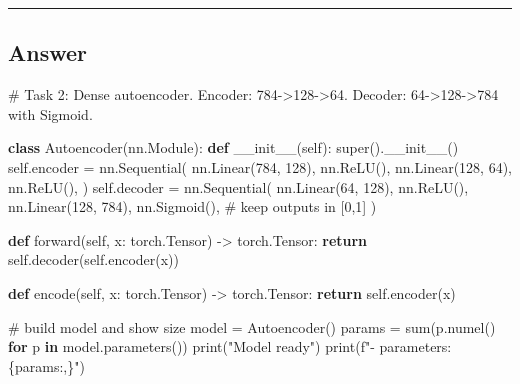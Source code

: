 \documentclass[
  letterpaper,
  DIV=11,
  numbers=noendperiod]{scrartcl}
\newenvironment{Shaded}{\begin{snugshade}}{\end{snugshade}}
\newcommand{\BuiltInTok}[1]{\textcolor[rgb]{0.00,0.23,0.31}{#1}}
\newcommand{\CommentTok}[1]{\textcolor[rgb]{0.37,0.37,0.37}{#1}}
\newcommand{\ControlFlowTok}[1]{\textcolor[rgb]{0.00,0.23,0.31}{\textbf{#1}}}
\newcommand{\DecValTok}[1]{\textcolor[rgb]{0.68,0.00,0.00}{#1}}
\newcommand{\FunctionTok}[1]{\textcolor[rgb]{0.28,0.35,0.67}{#1}}
\newcommand{\KeywordTok}[1]{\textcolor[rgb]{0.00,0.23,0.31}{\textbf{#1}}}
\newcommand{\NormalTok}[1]{\textcolor[rgb]{0.00,0.23,0.31}{#1}}
\newcommand{\OperatorTok}[1]{\textcolor[rgb]{0.37,0.37,0.37}{#1}}
\newcommand{\SpecialCharTok}[1]{\textcolor[rgb]{0.37,0.37,0.37}{#1}}
\newcommand{\SpecialStringTok}[1]{\textcolor[rgb]{0.13,0.47,0.30}{#1}}
\newcommand{\StringTok}[1]{\textcolor[rgb]{0.13,0.47,0.30}{#1}}
\newcommand{\VariableTok}[1]{\textcolor[rgb]{0.07,0.07,0.07}{#1}}
\begin{document}
\begin{center}\rule{0.5\linewidth}{0.5pt}\end{center}

\subsection{Answer}\label{answer-4}

\begin{Shaded}
\begin{Highlighting}[]
\CommentTok{\# Task 2: Dense autoencoder. Encoder: 784{-}\textgreater{}128{-}\textgreater{}64. Decoder: 64{-}\textgreater{}128{-}\textgreater{}784 with Sigmoid.}

\KeywordTok{class}\NormalTok{ Autoencoder(nn.Module):}
    \KeywordTok{def} \FunctionTok{\_\_init\_\_}\NormalTok{(}\VariableTok{self}\NormalTok{):}
        \BuiltInTok{super}\NormalTok{().}\FunctionTok{\_\_init\_\_}\NormalTok{()}
        \VariableTok{self}\NormalTok{.encoder }\OperatorTok{=}\NormalTok{ nn.Sequential(}
\NormalTok{            nn.Linear(}\DecValTok{784}\NormalTok{, }\DecValTok{128}\NormalTok{), nn.ReLU(),}
\NormalTok{            nn.Linear(}\DecValTok{128}\NormalTok{, }\DecValTok{64}\NormalTok{),  nn.ReLU(),}
\NormalTok{        )}
        \VariableTok{self}\NormalTok{.decoder }\OperatorTok{=}\NormalTok{ nn.Sequential(}
\NormalTok{            nn.Linear(}\DecValTok{64}\NormalTok{, }\DecValTok{128}\NormalTok{),  nn.ReLU(),}
\NormalTok{            nn.Linear(}\DecValTok{128}\NormalTok{, }\DecValTok{784}\NormalTok{), nn.Sigmoid(),  }\CommentTok{\# keep outputs in [0,1]}
\NormalTok{        )}

    \KeywordTok{def}\NormalTok{ forward(}\VariableTok{self}\NormalTok{, x: torch.Tensor) }\OperatorTok{{-}\textgreater{}}\NormalTok{ torch.Tensor:}
        \ControlFlowTok{return} \VariableTok{self}\NormalTok{.decoder(}\VariableTok{self}\NormalTok{.encoder(x))}

    \KeywordTok{def}\NormalTok{ encode(}\VariableTok{self}\NormalTok{, x: torch.Tensor) }\OperatorTok{{-}\textgreater{}}\NormalTok{ torch.Tensor:}
        \ControlFlowTok{return} \VariableTok{self}\NormalTok{.encoder(x)}

\CommentTok{\# build model and show size}
\NormalTok{model }\OperatorTok{=}\NormalTok{ Autoencoder()}
\NormalTok{params }\OperatorTok{=} \BuiltInTok{sum}\NormalTok{(p.numel() }\ControlFlowTok{for}\NormalTok{ p }\KeywordTok{in}\NormalTok{ model.parameters())}
\BuiltInTok{print}\NormalTok{(}\StringTok{"Model ready"}\NormalTok{)}
\BuiltInTok{print}\NormalTok{(}\SpecialStringTok{f"{-} parameters: }\SpecialCharTok{\{}\NormalTok{params}\SpecialCharTok{:,\}}\SpecialStringTok{"}\NormalTok{)}

\end{Highlighting}
\end{Shaded}
\end{document}
